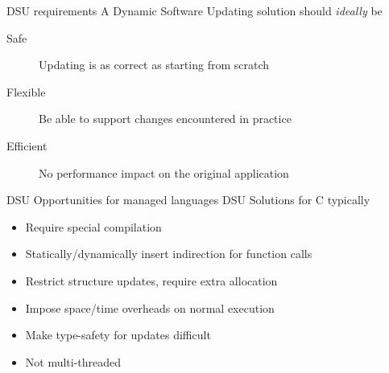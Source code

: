 \begin{frame}{DSU requirements}%
A Dynamic Software Updating solution should \emph{ideally} be
\begin{description}
\item[Safe] Updating is as correct as starting from scratch
\item[Flexible] Be able to support changes encountered in practice
\item[Efficient] No performance impact on the original application
\end{description}
\end{frame}


\begin{frame}{DSU Opportunities for managed languages}%
DSU Solutions for C typically
\begin{itemize}
\item Require special compilation
\item Statically/dynamically insert indirection for function calls
\item Restrict structure updates, require extra allocation
\item Impose space/time overheads on normal execution
\item Make type-safety for updates difficult
\item Not multi-threaded
\end{itemize}
\end{frame}

